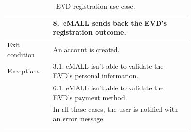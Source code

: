 \begin{center}
\begin{longtable}{lp{0.75\linewidth}}
        & 8.\ eMALL sends back the EVD’s registration outcome.                                                                                                                                                   \\
        \hline
        Exit condition   & An account is created.                                                                                                                                                                                 \\
        \hline
        Exceptions       & 3.1. eMALL isn’t able to validate the EVD’s personal information.                                                                                                                                      \\
        & 6.1. eMALL isn’t able to validate the EVD’s payment method.                                                                                                                                            \\
        & In all these cases, the user is notified with an error message.                                                                                                                                        \\
        \hline
        \caption{EVD registration use case.}
        \label{tab: EVD_sign_up_use_case}
    \end{longtable}
\end{center}

